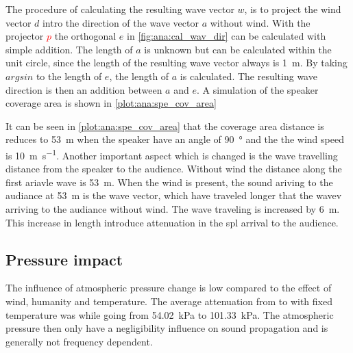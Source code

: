 The procedure of calculating the resulting wave vector $w$, is to project the wind vector $d$ intro the direction of the wave vector $a$ without wind. With the projector \textcolor{red}{$p$} the orthogonal $e$ in \autoref{fig:ana:cal_wav_dir} can be calculated with simple addition. The length of $a$ is unknown but can be calculated within the unit circle, since the length of the resulting wave vector always is \SI{1}{\meter}. By taking $argsin$ to the length of $e$, the length of $a$ is calculated. The resulting wave direction is then an addition between $a$ and $e$. A simulation of the speaker coverage area is shown in \autoref{plot:ana:spe_cov_area}



It can be seen in \autoref{plot:ana:spe_cov_area} that the coverage area distance is reduces to \SI{53}{\meter} when the speaker have an angle of \SI{90}{\degree} and the the wind speed is \SI{10}{\meter\per\second}. Another important aspect which is changed is the wave travelling distance from the speaker to the audience. Without wind the distance along the first ariavle wave is  \SI{53}{\meter}. When the wind is present, the sound ariving to the audiance at \SI{53}{\meter} is the wave vector, which have traveled longer that the wavev arriving to the audiance without wind. The wave traveling is increased by \SI{6}{\meter}. This increase in length introduce attenuation in the \gls{spl} arrival to the audience.


\subsection{Pressure impact}
The influence of atmospheric pressure change is low compared to the effect of wind, humanity and temperature. The average attenuation from  to  with fixed temperature was  while going from \SI{54.02}{\kilo\pascal} to \SI{101.33}{\kilo\pascal}. The atmospheric pressure then only have a negligibility influence on sound propagation and is generally not frequency dependent. 
 
 
